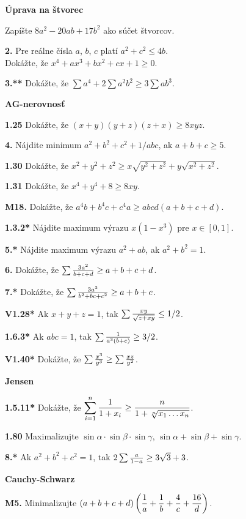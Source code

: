 \documentclass[10pt, twocolumn]{article}
\begin{document}

\centerline{\bf Úprava na štvorec}

 Zapíšte $8a^2-20ab+17b^2$ ako súčet štvorcov.

{\bf 2.} Pre reálne čísla $a$, $b$, $c$ platí $a^2+c^2\le 4b$.\\
Dokážte, že $x^4+ax^3+bx^2+cx+1\ge 0$.

{\bf 3.**} Dokážte, že $\sum a^4 + 2\sum a^2b^2\ge 3\sum ab^3$.

\bigskip
\centerline{\bf AG-nerovnosť}
\medskip

{\bf 1.25} Dokážte, že $(x+y)(y+z)(z+x)\ge 8xyz$.

{\bf 4.} Nájdite minimum $a^2+b^2+c^2+1/abc$, ak $a+b+c\ge 5$.

{\bf 1.30} Dokážte, že $x^2+y^2+z^2\ge x\sqrt{y^2+z^2}+y\sqrt{x^2+z^2}$.

{\bf 1.31} Dokážte, že $x^4+y^4+8\ge 8xy$.

{\bf M18.} Dokážte, že $a^4b + b^4c+c^4a\ge abcd(a+b+c+d)$.

{\bf 1.3.2*} Nájdite maximum výrazu $x(1-x^3)$ pre $x\in[0,1]$.

{\bf 5.*} Nájdite maximum výrazu $a^2+ab$, ak $a^2+b^2=1$.

{\bf 6.} Dokážte, že $\sum {3a^2\over b+c+d}\ge a+b+c+d$.

{\bf 7.*} Dokážte, že $\sum {3a^3\over b^2+bc+c^2}\ge a+b+c$.

{\bf V1.28*} Ak $x+y+z=1$, tak $\sum {xy\over \sqrt{z+xy}}\le 1/2$.

{\bf 1.6.3*} Ak $abc=1$, tak $\sum {1\over a^3(b+c)}\ge 3/2$.

{\bf V1.40*} Dokážte, že $\sum {x^3\over y^3}\ge \sum{xz\over y^2}$.

\bigskip
\centerline{\bf Jensen}
\medskip

{\bf 1.5.11*} Dokážte, že $\displaystyle\sum_{i=1}^n {1\over 1+x_i}\ge{n\over1+\root n \of {x_1\dots x_n}}$.

{\bf 1.80} Maximalizujte $\sin\alpha \cdot \sin\beta\cdot \sin\gamma$, $\sin\alpha+\sin\beta+\sin\gamma$.

{\bf 8.*} Ak $a^2+b^2+c^2=1$, tak $2\sum {a\over 1-a}\ge 3\sqrt 3+3$.

\bigskip
\centerline{\bf Cauchy-Schwarz}
\medskip

{\bf M5.} Minimalizujte $\displaystyle (a+b+c+d)\left({1\over a}+{1\over b}+{4\over c}+{16 \over d}\right)$.
\end{document}
